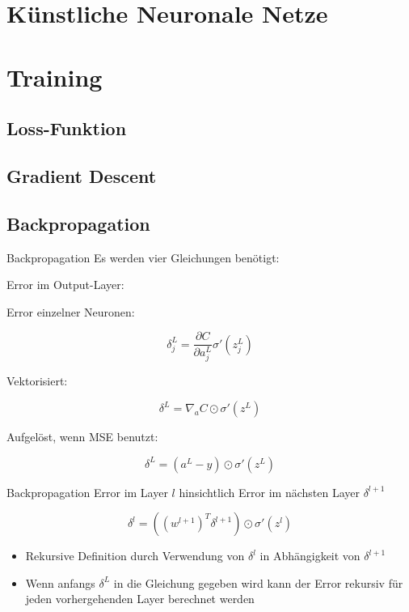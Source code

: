 \documentclass[aspectratio=169, 10pt]{beamer}
\begin{document}
\section{Künstliche Neuronale Netze}%
\label{sec:ann}

\section{Training}
\label{sec:train}

\subsection{Loss-Funktion}
\label{sec:loss}



\subsection{Gradient Descent}
\label{sec:graddesc}



\subsection{Backpropagation}
\label{sec:backprop}

\begin{frame}{Backpropagation}
  Es werden vier Gleichungen benötigt:

  Error im Output-Layer:

  Error einzelner Neuronen:

  \[\delta_j^L = \frac{\partial C}{\partial a_j^L} \sigma' \left(z_j^L\right)\]

  Vektorisiert:

  \[\delta^L = \nabla_aC \odot \sigma'(z^L)\]

  Aufgelöst, wenn MSE benutzt:

  \[\delta^L = (a^L - y) \odot \sigma'(z^L)\]
\end{frame}

\begin{frame}{Backpropagation}
  Error im Layer \(l\) hinsichtlich Error im nächsten Layer \(\delta^{l+1}\)

  \[\delta^l = \left(\left(w^{l+1}\right)^T\delta^{l+1}\right) \odot
    \sigma'\left(z^l\right)\]

  \begin{itemize}
  \item Rekursive Definition durch Verwendung von \(\delta^l\) in Abhängigkeit
    von \(\delta^{l+1}\)
  \item Wenn anfangs \(\delta^L\) in die Gleichung gegeben wird kann der Error
    rekursiv für jeden vorhergehenden Layer berechnet werden
  \end{itemize}
\end{frame}
\end{document}

